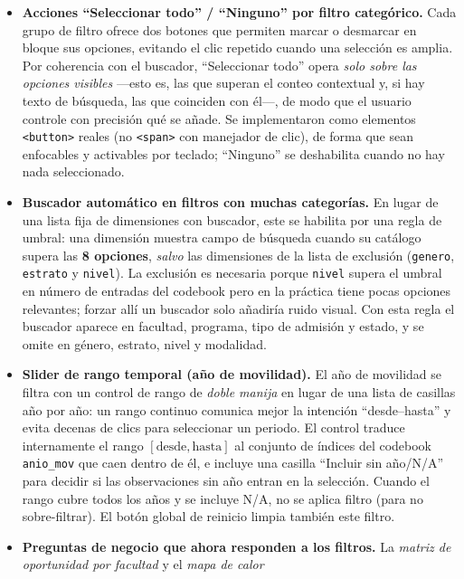 \documentclass[12pt,a4paper]{article}
\begin{document}
\begin{itemize}[leftmargin=*]
    \item \textbf{Acciones ``Seleccionar todo'' / ``Ninguno'' por filtro
    categórico.} Cada grupo de filtro ofrece dos botones que permiten marcar o
    desmarcar en bloque sus opciones, evitando el clic repetido cuando una
    selección es amplia. Por coherencia con el buscador, ``Seleccionar todo'' opera
    \emph{solo sobre las opciones visibles} ---esto es, las que superan el conteo
    contextual y, si hay texto de búsqueda, las que coinciden con él---, de modo que
    el usuario controle con precisión qué se añade. Se implementaron como elementos
    \texttt{<button>} reales (no \texttt{<span>} con manejador de clic), de forma
    que sean enfocables y activables por teclado; ``Ninguno'' se deshabilita cuando
    no hay nada seleccionado.
    \item \textbf{Buscador automático en filtros con muchas categorías.} En lugar de
    una lista fija de dimensiones con buscador, este se habilita por una regla de
    umbral: una dimensión muestra campo de búsqueda cuando su catálogo supera las
    \textbf{8 opciones}, \emph{salvo} las dimensiones de la lista de exclusión
    (\texttt{genero}, \texttt{estrato} y \texttt{nivel}). La exclusión es necesaria
    porque \texttt{nivel} supera el umbral en número de entradas del codebook pero
    en la práctica tiene pocas opciones relevantes; forzar allí un buscador solo
    añadiría ruido visual. Con esta regla el buscador aparece en facultad, programa,
    tipo de admisión y estado, y se omite en género, estrato, nivel y modalidad.
    \item \textbf{Slider de rango temporal (año de movilidad).} El año de movilidad
    se filtra con un control de rango de \emph{doble manija} en lugar de una lista de
    casillas año por año: un rango continuo comunica mejor la intención
    ``desde--hasta'' y evita decenas de clics para seleccionar un periodo. El control
    traduce internamente el rango $[\text{desde},\text{hasta}]$ al conjunto de
    índices del codebook \texttt{anio\_mov} que caen dentro de él, e incluye una
    casilla ``Incluir sin año/N/A'' para decidir si las observaciones sin año entran
    en la selección. Cuando el rango cubre todos los años y se incluye N/A, no se
    aplica filtro (para no sobre-filtrar). El botón global de reinicio limpia también
    este filtro.
    \item \textbf{Preguntas de negocio que ahora responden a los filtros.} La
    \emph{matriz de oportunidad por facultad} y el \emph{mapa de calor
}
\end{itemize}
\end{document}
